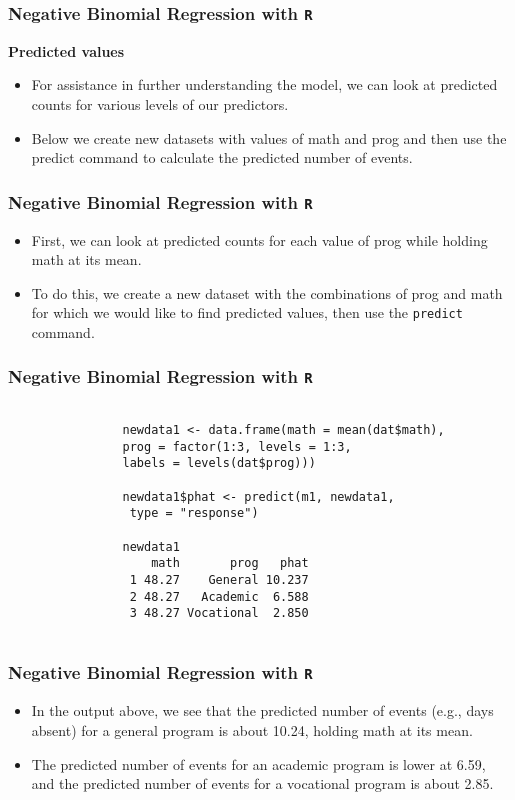 \documentclass[MASTER.tex]{subfiles}
\begin{document}
	\begin{frame}[fragile]
		\frametitle{Negative Binomial Regression with \texttt{R} }
		\Large
		\textbf{Predicted values}
		\begin{itemize}
			\item	For assistance in further understanding the model, we can look at predicted counts for various levels of our predictors. 
			\item Below we create new datasets with values of math and prog and then use the predict command to calculate the predicted number of events.
		\end{itemize}
\end{frame}
\begin{frame}[fragile]
		\frametitle{Negative Binomial Regression with \texttt{R} }
		\Large
\begin{itemize}
			\item	First, we can look at predicted counts for each value of prog while holding math at its mean. 
			\item To do this, we create a new dataset with the combinations of prog and math for which we would like to find predicted values, then use the \texttt{predict} command.
		\end{itemize}
	\end{frame}
	\begin{frame}[fragile]
		\frametitle{Negative Binomial Regression with \texttt{R} }
		\large
		
		\begin{framed}
			\begin{verbatim}
			
				newdata1 <- data.frame(math = mean(dat$math), 
				prog = factor(1:3, levels = 1:3, 
				labels = levels(dat$prog)))
				
				newdata1$phat <- predict(m1, newdata1, 
				 type = "response")
				 
				newdata1
				    math       prog   phat
				 1 48.27    General 10.237
				 2 48.27   Academic  6.588
				 3 48.27 Vocational  2.850
			
			\end{verbatim}	
		\end{framed}
		
		
	\end{frame}
\begin{frame}[fragile]
	\frametitle{Negative Binomial Regression with \texttt{R} }
	\Large
	
\begin{itemize}
\item In the output above, we see that the predicted number of events (e.g., days absent) for a general program is about 
10.24, holding math at its mean. 
\item The predicted number of events for an academic program is lower at 6.59, and the predicted number of events for a vocational program is about 2.85.
\end{itemize}
\end{frame}
\end{document}
